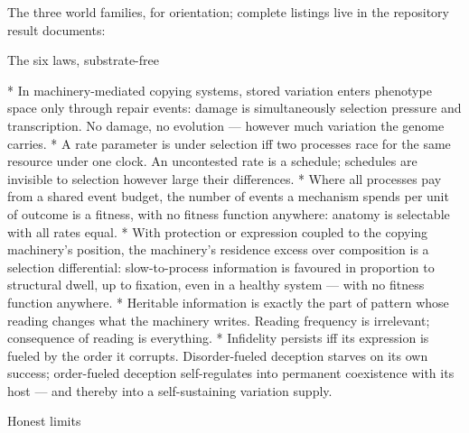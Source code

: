 \noindent The three world families, for orientation; complete
listings live in the repository result documents:

\medskip
\noindent{}
\medskip

\sec The six laws, substrate-free

\begitems
*  In machinery-mediated copying systems,
stored variation enters phenotype space only through repair
events: damage is simultaneously selection pressure and
transcription. No damage, no evolution --- however much variation
the genome carries.
*  A rate parameter is under selection iff two
processes race for the same resource under one clock. An
uncontested rate is a schedule; schedules are invisible to
selection however large their differences.
*  Where all processes pay from a
shared event budget, the number of events a mechanism spends per
unit of outcome is a fitness, with no fitness function anywhere:
anatomy is selectable with all rates equal.
*  With protection or expression coupled
to the copying machinery's position, the machinery's residence
excess over composition is a selection differential:
slow-to-process information is favoured in proportion to
structural dwell, up to fixation, even in a healthy system ---
with no fitness function anywhere.
*  Heritable information is exactly the part
of pattern whose reading changes what the machinery writes.
Reading frequency is irrelevant; consequence of reading is
everything.
*  Infidelity persists iff its expression is
fueled by the order it corrupts. Disorder-fueled deception starves
on its own success; order-fueled deception self-regulates into
permanent coexistence with its host --- and thereby into a
self-sustaining variation supply.
\enditems

\sec Honest limits

